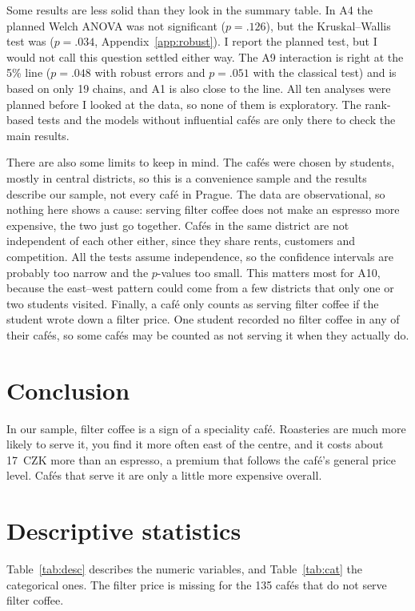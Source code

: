 \documentclass[11pt,a4paper]{article}
\begin{document}
Some results are less solid than they look in the summary table. In A4 the planned Welch ANOVA was not significant ($p=.126$), but the Kruskal--Wallis test was ($p=.034$, Appendix~\ref{app:robust}). I report the planned test, but I would not call this question settled either way. The A9 interaction is right at the 5\% line ($p=.048$ with robust errors and $p=.051$ with the classical test) and is based on only 19 chains, and A1 is also close to the line. All ten analyses were planned before I looked at the data, so none of them is exploratory. The rank-based tests and the models without influential caf\'es are only there to check the main results.

There are also some limits to keep in mind. The caf\'es were chosen by students, mostly in central districts, so this is a convenience sample and the results describe our sample, not every caf\'e in Prague. The data are observational, so nothing here shows a cause: serving filter coffee does not make an espresso more expensive, the two just go together. Caf\'es in the same district are not independent of each other either, since they share rents, customers and competition. All the tests assume independence, so the confidence intervals are probably too narrow and the $p$-values too small. This matters most for A10, because the east--west pattern could come from a few districts that only one or two students visited. Finally, a caf\'e only counts as serving filter coffee if the student wrote down a filter price. One student recorded no filter coffee in any of their caf\'es, so some caf\'es may be counted as not serving it when they actually do.

\section{Conclusion}
In our sample, filter coffee is a sign of a speciality caf\'e. Roasteries are much more likely to serve it, you find it more often east of the centre, and it costs about 17~CZK more than an espresso, a premium that follows the caf\'e's general price level. Caf\'es that serve it are only a little more expensive overall.

\appendix

\section{Descriptive statistics}\label{app:desc}
Table~\ref{tab:desc} describes the numeric variables, and Table~\ref{tab:cat} the categorical ones. The filter price is missing for the 135 caf\'es that do not serve filter coffee.
\end{document}
